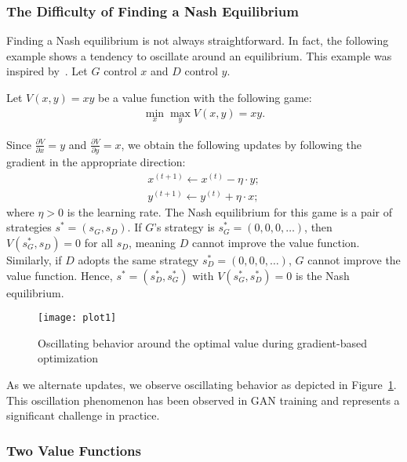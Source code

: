 \subsubsection{The Difficulty of Finding a Nash Equilibrium}
\label{sec:difficulty}

Finding a Nash equilibrium is not always straightforward. In fact, the following example shows a tendency to oscillate around an equilibrium. This example was inspired by~\cite{ref:weng-2017}. Let $G$ control $x$ and $D$ control $y$.

\begin{example}
	Let $V(x, y) = xy$ be a value function with the following game:
	\begin{align}
		\min_x\max_y V(x, y) = xy.
	\end{align}

	Since $\frac{\partial V}{\partial x} = y$ and $\frac{\partial V}{\partial y} = x$, we obtain the following updates by following the gradient in the appropriate direction:
	\begin{align}
		x^{(t+1)} \gets x^{(t)} - \eta \cdot y; \\
		y^{(t+1)} \gets y^{(t)} + \eta \cdot x;
	\end{align}
	where $\eta > 0$ is the learning rate. The Nash equilibrium for this game is a pair of strategies $s^* = (s_G, s_D)$. If $G$'s strategy is $s^*_G = (0, 0, 0, \dots)$, then $V(s^*_G, s_D) = 0$ for all $s_D$, meaning $D$ cannot improve the value function. Similarly, if $D$ adopts the same strategy $s^*_D = (0, 0, 0, \dots)$, $G$ cannot improve the value function. Hence, $s^* = (s^*_D, s^*_G)$ with $V(s^*_G, s^*_D) = 0$ is the Nash equilibrium.

	\begin{figure}[H]
		\centering
		\texttt{[image: plot1]}
		\caption{Oscillating behavior around the optimal value during gradient-based optimization}
		\label{fig:alternating}
	\end{figure}
\end{example}

As we alternate updates, we observe oscillating behavior as depicted in Figure~\ref{fig:alternating}. This oscillation phenomenon has been observed in GAN training and represents a significant challenge in practice.

\subsubsection{Two Value Functions}%
\label{sec:two-value}

